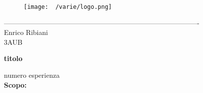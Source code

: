 \documentclass{article}
\begin{document}
    \begin{titlepage}
    \begin{center}
\begin{figure}
    \centering
    \texttt{[image: ~/varie/logo.png]}
    \label{fig:logo}
\end{figure}
-------------------------------------------------------------------------------------\\
\vspace{2\baselineskip}
\large Enrico Ribiani\\
\large 3AUB\\
\vfill

\Huge{\textbf{titolo}}\\
\vfill

\LARGE{numero esperienza}\\
\vfill
\LARGE{\textbf{Scopo:} }\\
\vfill
\end{center}
\end{titlepage}
\end{document}
